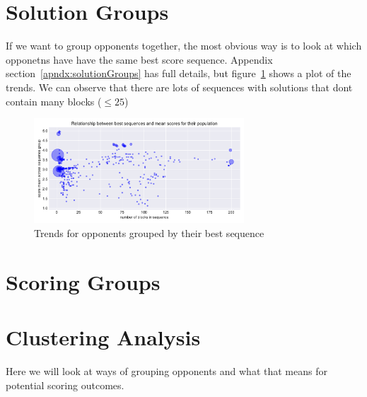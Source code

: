 \section{Solution Groups}\label{sec:solutionGroups}
If we want to group opponents together, the most obvious way is to look at which opponetns have have the same best score sequence.
Appendix section~\ref{apndx:solutionGroups} has full details, but figure~\ref{fig:sequence_scatter} shows a plot of the trends. 
We can observe that there are lots of sequences with solutions that dont contain many blocks ($\le 25$)
\begin{figure}[h]
    \includegraphics[width=0.7\textwidth, center]{./img/descriptive/sequence_scatter.pdf}
    \caption{Trends for opponents grouped by their best sequence}\label{fig:sequence_scatter}
\end{figure}

\section{Scoring Groups}
    

\section{Clustering Analysis}
Here we will look at ways of grouping opponents and what that means for potential scoring outcomes.
